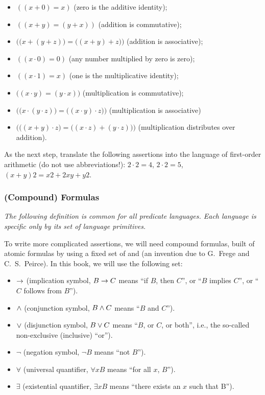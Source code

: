 \begin{itemize}
    \item \(((x+0)=x)\) (zero is the additive identity);
    \item \(((x+y)=(y+x))\) (addition is commutative);
    \item \(\Big(\big(x+(y+z)\big)=\big((x+y)+z\big)\Big)\) (addition is associative);
    \item \(((x\cdot 0)=0)\) (any number multiplied by zero is zero);
    \item \(((x\cdot 1)=x)\) (one is the multiplicative identity);
    \item \(\big((x\cdot y)=(y\cdot x)\big)\) (multiplication is commutative);
    \item \(\Big(\big(x\cdot (y\cdot z)\big)=\big((x\cdot y)\cdot z\big)\Big)\) (multiplication is associative)
    \item \(\Big(\big((x+y)\cdot z\big)=\big((x\cdot z)+(y\cdot z)\big)\Big)\) (multiplication distributes over addition).
\end{itemize}

\begin{exercise}
As the next step, translate the following assertions into the language of first-order arithmetic (do not use abbreviations!): \(2\cdot 2=4\), \(2\cdot 2=5\), \((x+y)2 = x2+2xy+y2\).
\end{exercise}

\subsubsection*{(Compound) Formulas}

\emph{The following definition is common for all predicate languages.
Each language is specific only by its set of language primitives.}

To write more complicated assertions, we will need compound formulas, built of atomic formulas by using a fixed set of  and  (an invention due to G.~Frege and C.~S.~Peirce).
In this book, we will use the following set:

\begin{itemize}
    \item \(\rightarrow\) (implication symbol, \(B\rightarrow C\) means ``if \(B\), then \(C\)'', or ``\(B\) implies \(C\)'', or ``\(C\) follows from \(B\)'').
    \item \(\wedge\) (conjunction symbol, \(B\wedge C\) means ``\(B\) and \(C\)'').
    \item \(\vee\) (disjunction symbol, \(B\vee C\) means ``\(B\), or \(C\), or both'', i.e., the so-called non-exclusive (inclusive) ``or'').
    \item \(\neg\)  (negation symbol, \(\neg B\) means ``not \(B\)'').
    \item \(\forall\)  (universal quantifier, \(\forall xB\) means ``for all \(x\), \(B\)'').
    \item \(\exists\)  (existential quantifier, \(\exists xB\) means ``there exists an \(x\) such that B'').
\end{itemize}

